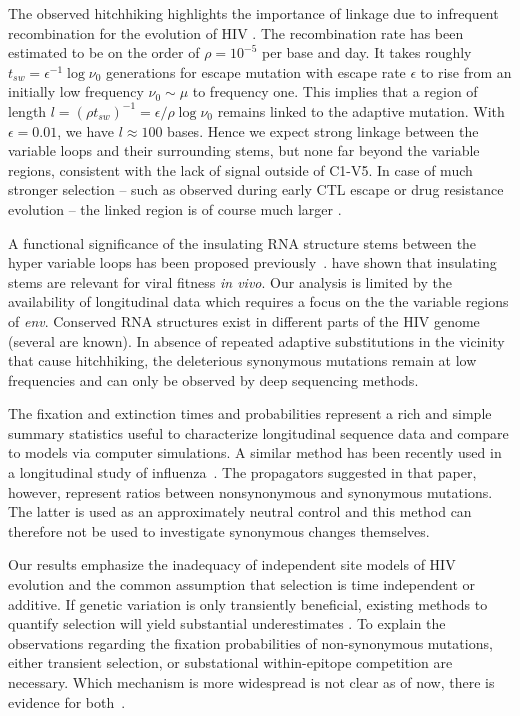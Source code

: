 \documentclass[rmp, twocolumn]{revtex4}
\newcommand{\env}{\textit{env}}
\begin{document}
The observed hitchhiking highlights the importance of linkage due to infrequent
recombination for the evolution of HIV
\citep{neher_recombination_2010,batorsky_estimate_2011,
josefsson_majority_2011}. The recombination rate has been estimated to be on the
order of $\rho = 10^{-5}$ per base and day. It takes roughly $t_{sw} =
\epsilon^{-1} \log \nu_0$ generations for escape mutation with escape rate $\epsilon$ to rise
from an initially low frequency $\nu_0\sim \mu$ to frequency one. This implies
that a region of length $l = (\rho t_{sw})^{-1} = \epsilon / \rho \log \nu_0$
remains linked to the adaptive mutation. With $\epsilon=0.01$, we have $l\approx
100$ bases. Hence we expect strong linkage between the variable loops and their
surrounding stems, but none far beyond the variable regions, consistent with the lack of signal
outside of C1-V5. In case of much stronger selection -- such as observed during
early CTL escape or drug resistance evolution -- the linked  region is of course
much larger \citep{nijhuis_stochastic_1998}.

A functional significance of the insulating RNA structure stems between the
hyper variable loops has been proposed
previously~\citep{watts_architecture_2009, sanjuan_interplay_2011}.
\citet{sanjuan_interplay_2011} have shown that insulating stems are relevant for
viral fitness {\it in vivo}. Our analysis is limited by the availability of
longitudinal data which requires a focus on the the variable regions of \env.
Conserved RNA structures exist in different parts of the HIV genome (several are
known). In absence of repeated adaptive substitutions in the vicinity that cause
hitchhiking, the deleterious synonymous mutations remain at low frequencies and
can only be observed by deep sequencing methods. 

The fixation and extinction times and probabilities represent a rich and simple
summary statistics useful to characterize longitudinal sequence data and compare
to models via computer simulations.
A similar method has been recently used in a longitudinal study of
influenza~\citep{strelkowa_clonal_2012}. The propagators suggested in that
paper, however, represent ratios between nonsynonymous and synonymous mutations.
The latter is used as an approximately neutral control and this method can
therefore not be used to investigate synonymous changes themselves.

Our results emphasize the inadequacy of independent site
models of HIV evolution and the common assumption that selection is time
independent or additive. If genetic variation is only transiently beneficial,
existing methods to quantify selection will yield substantial underestimates
\citep{williamson_adaptation_2003,neher_rate_2010,batorsky_estimate_2011}. To explain the
observations regarding the fixation probabilities of non-synonymous mutations,
either transient selection, or substational within-epitope competition are
necessary. Which mechanism is more widespread is not clear as of now,
there is evidence for both~\citep{richman_rapid_2003, moore_limited_2009,
bar_early_2012}.
\end{document}
